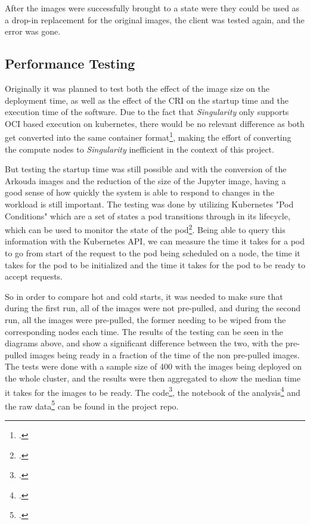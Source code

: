 After the images were successfully brought to a state were they could be used as
a drop-in replacement for the original images, the client was tested again, and the error was gone.



\subsection{Performance Testing}
\label{sec:performance_testing}

Originally it was planned to test both the effect of the image size on the deployment time,
as well as the effect of the \ac{CRI} on the startup time and the execution time of the software.
Due to the fact that \textit{Singularity} only supports \ac{OCI} based execution on kubernetes,
there would be no relevant difference as both get converted into the same container format\footcite{opencontainerinitiativeImagespecSpecMd2024},
making the effort of converting the compute nodes to \textit{Singularity} inefficient in
the context of this project.

But testing the startup time was still possible and with the conversion of the Arkouda images and the
reduction of the size of the Jupyter image, having a good sense of how quickly the system is able to respond
to changes in the workload is still important.
The testing was done by utilizing Kubernetes "Pod Conditions" which are a set of states a pod
transitions through in its lifecycle, which can be used to monitor the state of the pod\footcite{kubernetes-docsPodLifecycle}.
Being able to query this information with the Kubernetes API, we can measure the time it takes for a pod to go from
start of the request to the pod being scheduled on a node, the time it takes for the pod to be initialized and the time it takes for the pod to be ready to accept requests.

So in order to compare hot and cold starts, it was needed to make sure that during the first run,
all of the images were not pre-pulled, and during the second run, all the images were pre-pulled,
the former needing to be wiped from the corresponding nodes each time.
The results of the testing can be seen in the diagrams above, and show a significant difference between the two,
with the pre-pulled images being ready in a fraction of the time of the non pre-pulled images.
The tests were done with a sample size of 400 with the images being deployed on the whole cluster,
and the results were then aggregated to show the median time it takes for the images to be ready.
The code\footcite{joneckerthBachelorThesisProjecte}, the notebook of the analysis\footcite{joneckerthBachelorThesisProjectd} and the raw data\footcite{joneckerthBachelorThesisProjectc} can be found in the project repo.


